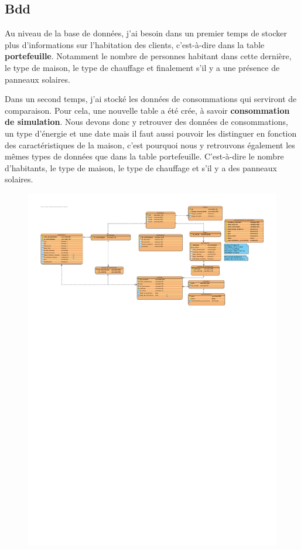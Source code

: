 \subsection{Bdd}

\begin{flushleft}
Au niveau de la base de données, j'ai besoin dans un premier temps de stocker plus d'informations sur l'habitation des clients, c'est-à-dire dans la table \textbf{portefeuille}. Notamment le nombre de personnes habitant dans cette dernière, le type de maison, le type de chauffage et finalement s'il y a une présence de panneaux solaires.
\end{flushleft}

\begin{flushleft}
Dans un second temps, j'ai stocké les données de consommations qui serviront de comparaison. Pour cela, une nouvelle table a été crée, à savoir \textbf{consommation de simulation}. Nous devons donc y retrouver des données de consommations, un type d'énergie et une date mais il faut aussi pouvoir les distinguer en fonction des caractéristiques de la maison, c'est pourquoi nous y retrouvons également les mêmes types de données que dans la table portefeuille. C'est-à-dire le nombre d'habitants, le type de maison, le type de chauffage et s'il y a des panneaux solaires.
\end{flushleft}

\begin{figure}[h]
\centering
\includegraphics[width=1.3\textwidth]{extension-adrien/Bdd/img/bdd.pdf}
\end{figure}
